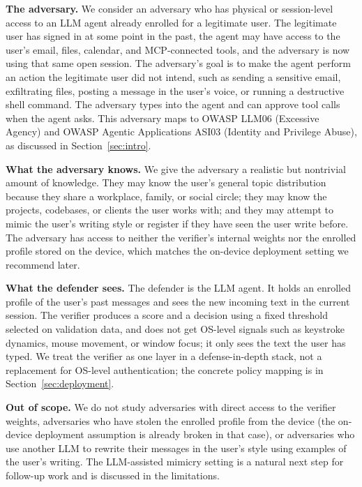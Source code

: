 \documentclass[11pt]{article}
\begin{document}
\noindent\textbf{The adversary.} We consider an adversary who has physical or session-level access to an LLM agent already enrolled for a legitimate user. The legitimate user has signed in at some point in the past, the agent may have access to the user's email, files, calendar, and MCP-connected tools, and the adversary is now using that same open session. The adversary's goal is to make the agent perform an action the legitimate user did not intend, such as sending a sensitive email, exfiltrating files, posting a message in the user's voice, or running a destructive shell command. The adversary types into the agent and can approve tool calls when the agent asks. This adversary maps to OWASP LLM06 (Excessive Agency) and OWASP Agentic Applications ASI03 (Identity and Privilege Abuse), as discussed in Section~\ref{sec:intro}.

\noindent\textbf{What the adversary knows.} We give the adversary a realistic but nontrivial amount of knowledge. They may know the user's general topic distribution because they share a workplace, family, or social circle; they may know the projects, codebases, or clients the user works with; and they may attempt to mimic the user's writing style or register if they have seen the user write before. The adversary has access to neither the verifier's internal weights nor the enrolled profile stored on the device, which matches the on-device deployment setting we recommend later.

\noindent\textbf{What the defender sees.} The defender is the LLM agent. It holds an enrolled profile of the user's past messages and sees the new incoming text in the current session. The verifier produces a score and a decision using a fixed threshold selected on validation data, and does not get OS-level signals such as keystroke dynamics, mouse movement, or window focus; it only sees the text the user has typed. We treat the verifier as one layer in a defense-in-depth stack, not a replacement for OS-level authentication; the concrete policy mapping is in Section~\ref{sec:deployment}.

\noindent\textbf{Out of scope.} We do not study adversaries with direct access to the verifier weights, adversaries who have stolen the enrolled profile from the device (the on-device deployment assumption is already broken in that case), or adversaries who use another LLM to rewrite their messages in the user's style using examples of the user's writing. The LLM-assisted mimicry setting is a natural next step for follow-up work and is discussed in the limitations.
\end{document}
